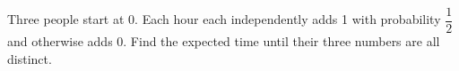Three people start at 0. Each hour each independently adds 1 with probability $\dfrac{1}{2}$ and otherwise adds 0. Find the expected time until their three numbers are all distinct.

